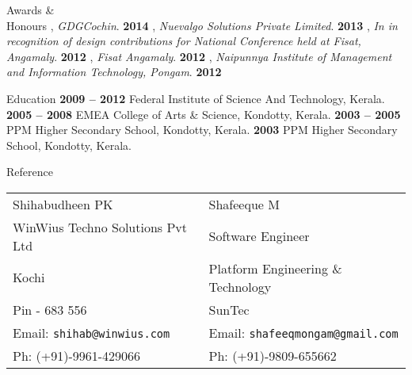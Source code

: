 \documentclass{resume}
\begin{document}

\begin{category}{Awards \&\\ Honours}
  , {\em GDGCochin}. \hfill \textbf{2014}
  , {\em Nuevalgo Solutions Private Limited}. \hfill \textbf{2013}
  , {\em  In in recognition of design contributions for National Conference held at Fisat, Angamaly}. \hfill \textbf{2012}
  , {\em Fisat Angamaly}. \hfill \textbf{2012}
  , {\em  Naipunnya  Institute  of  Management  and  Information  Technology, Pongam}. \hfill \textbf{2012}
\end{category}


\begin{category}{Education}
   \hfill \textbf{2009 -- 2012}
  \citemnobullet Federal Institute of Science And Technology, Kerala.
   \hfill \textbf{2005 -- 2008}
  \citemnobullet  EMEA College of Arts \& Science, Kondotty, Kerala.
   \hfill \textbf{2003 -- 2005}
  \citemnobullet PPM Higher Secondary School, Kondotty, Kerala.
   \hfill \textbf{2003}
  \citemnobullet PPM Higher Secondary School, Kondotty, Kerala.\end{category}
  



\begin{category}{Reference}
  \citemnobullet \\
  \begin{tabular}{ll}Shihabudheen PK&Shafeeque M\\
    WinWius Techno Solutions Pvt Ltd&Software Engineer\\
    Kochi&Platform Engineering \& Technology\\
    Pin -  683 556&SunTec\\
    Email: \mbox{\small\tt shihab@winwius.com}&Email: \mbox{\small\tt shafeeqmongam@gmail.com}\\
    Ph: (+91)-9961-429066&Ph: (+91)-9809-655662
  \end{tabular}
\end{category}
\end{document}
